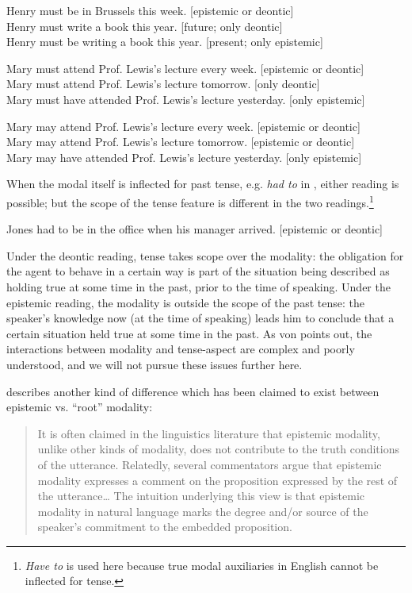 \ea
\ea Henry must be in Brussels this week.  [epistemic or deontic]\\
\ex Henry must write a book this year.  [future; only deontic]\\
\ex Henry must be writing a book this year.  [present; only epistemic]
                       \z
\z

\ea
\ea Mary must attend Prof. Lewis’s lecture every week.  [epistemic or deontic]\\
\ex Mary must attend Prof. Lewis’s lecture tomorrow.  [only deontic]\\
\ex Mary must have attended Prof. Lewis’s lecture yesterday.  [only epistemic]
                       \z
\z

\ea
\ea Mary may attend Prof. Lewis’s lecture every week.  [epistemic or deontic]\\
\ex Mary may attend Prof. Lewis’s lecture tomorrow.  [epistemic or deontic]\\
\ex Mary may have attended Prof. Lewis’s lecture yesterday.  [only epistemic]
                       \z
\z


When the modal itself is inflected for past tense, e.g. \textit{had to} in , either reading is possible; but the scope of the tense feature is different in the two readings.\footnote{\textit{Have to} is used here because true modal auxiliaries in English cannot be inflected for tense.}


\ea
Jones had to be in the office when his manager arrived.  [epistemic or deontic]
\z


Under the deontic reading, tense takes scope over the modality: the obligation for the agent to behave in a certain way is part of the situation being described as holding true at some time in the past, prior to the time of speaking. Under the epistemic reading, the modality is outside the scope of the past tense: the speaker’s knowledge now (at the time of speaking) leads him to conclude that a certain situation held true at some time in the past. As von \citet{Fintel2006} points out, the interactions between modality and tense-aspect are complex and poorly understood, and we will not pursue these issues further here.



\citet[1688]{Papafragou2006} describes another kind of difference which has been claimed to exist between epistemic vs. “root” modality:


\begin{quote}
It is often claimed in the linguistics literature that epistemic modality, unlike other kinds of modality, does not contribute to the truth conditions of the utterance. Relatedly, several commentators argue that epistemic modality expresses a comment on the proposition expressed by the rest of the utterance…  The intuition underlying this view is that epistemic modality in natural language marks the degree and/or source of the speaker’s commitment to the embedded proposition.
\end{quote}


